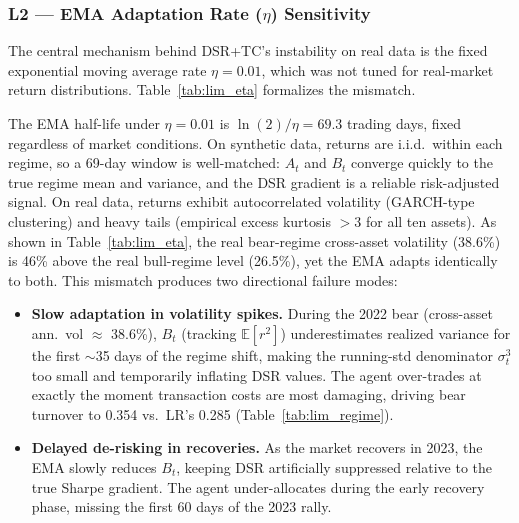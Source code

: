 \documentclass[conference]{IEEEtran}
\begin{document}
\subsubsection{L2 --- EMA Adaptation Rate ($\eta$) Sensitivity}

The central mechanism behind DSR+TC's instability on real data is the
fixed exponential moving average rate $\eta = 0.01$, which was not
tuned for real-market return distributions. Table~\ref{tab:lim_eta}
formalizes the mismatch.

\begin{table}[t]
\caption{EMA Half-Life vs.\ Market Volatility Regime ($\eta = 0.01$)}
\label{tab:lim_eta}
\centering
{}
\end{table}

The EMA half-life under $\eta = 0.01$ is $\ln(2)/\eta = 69.3$
trading days, fixed regardless of market conditions. On synthetic
data, returns are i.i.d.\ within each regime, so a 69-day window is
well-matched: $A_t$ and $B_t$ converge quickly to the true regime
mean and variance, and the DSR gradient is a reliable risk-adjusted
signal. On real data, returns exhibit autocorrelated volatility
(GARCH-type clustering) and heavy tails (empirical excess kurtosis
$> 3$ for all ten assets). As shown in Table~\ref{tab:lim_eta},
the real bear-regime cross-asset volatility (38.6\%) is 46\% above
the real bull-regime level (26.5\%), yet the EMA adapts identically
to both. This mismatch produces two directional failure modes:

\begin{itemize}
    \item \textbf{Slow adaptation in volatility spikes.}
    During the 2022 bear (cross-asset ann.\ vol $\approx$ 38.6\%),
    $B_t$ (tracking $\mathbb{E}[r^2]$) underestimates realized
    variance for the first $\sim$35 days of the regime shift,
    making the running-std denominator $\sigma_t^3$ too small
    and temporarily inflating DSR values.
    The agent over-trades at exactly the moment transaction costs
    are most damaging, driving bear turnover to 0.354
    vs.\ LR's 0.285 (Table~\ref{tab:lim_regime}).
    \item \textbf{Delayed de-risking in recoveries.}
    As the market recovers in 2023, the EMA slowly reduces $B_t$,
    keeping DSR artificially suppressed relative to the true
    Sharpe gradient. The agent under-allocates during the early
    recovery phase, missing the first 60 days of the 2023 rally.
\end{itemize}
\end{document}
